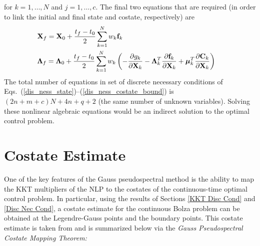 \documentclass[10pt,final]{report}
\begin{document}
for $k = 1,\ldots,N$ and $j = 1,\ldots,c$. The final two
equations that are required (in order to link the initial and final
state and costate, respectively) are
\begin{eqnarray}
  & \textbf{X}_f = \textbf{X}_0 + \displaystyle\frac{t_f -
    t_0}{2} \sum_{k = 1}^N w_k  \textbf{f}_k &  \vspace{6pt}
  \label{dis_ness_state_bound} \\
  & \boldsymbol{\Lambda}_f = \boldsymbol{\Lambda}_0 +
  \displaystyle\frac{t_f-t_0}{2} \sum_{k = 1}^N w_k  \left(
    -\frac{\partial g_k}{\partial \textbf{X}_k} - \boldsymbol{\Lambda}^T_k
    \frac{\partial \textbf{f}_k}{\partial \textbf{X}_k} +
    \boldsymbol{\mu}_k^T \frac{\partial \textbf{C}_k}{\partial
      \textbf{X}_k} \right)
  \label{dis_ness_costate_bound}
\end{eqnarray}
The total number of equations in set of discrete necessary conditions
of Eqs.~(\ref{dis_ness_state})--(\ref{dis_ness_costate_bound}) is
$(2n+m+c)N+4n+q+2$ (the same number of unknown variables).  Solving
these nonlinear algebraic equations would be an indirect solution to
the optimal control problem.

\section{Costate Estimate}

One of the key features of the Gauss pseudospectral method is the ability to
map the KKT multipliers of the NLP to the costates of the continuous-time
optimal control problem.  In particular, using the results of Sections
\ref{KKT Disc Cond} and \ref{Disc Nec Cond}, a costate estimate for the
continuous Bolza problem can be obtained at the Legendre-Gauss points and the
boundary points.  This costate estimate is taken from \cite{Benson1} and is
summarized below via the {\em Gauss Pseudospectral Costate Mapping Theorem:}

\vspace{12pt}
\end{document}
